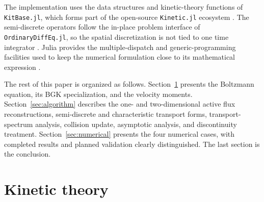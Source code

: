 \documentclass[preprint,3p,12pt]{elsarticle}
\begin{document}
The implementation uses the data structures and kinetic-theory functions of \texttt{KitBase.jl}, which forms part of the open-source \texttt{Kinetic.jl} ecosystem \cite{xiao2021kinetic}. The semi-discrete operators follow the in-place problem interface of \texttt{OrdinaryDiffEq.jl}, so the spatial discretization is not tied to one time integrator \cite{rackauckas2017differentialequations}. Julia provides the multiple-dispatch and generic-programming facilities used to keep the numerical formulation close to its mathematical expression \cite{bezanson2017julia}.

The rest of this paper is organized as follows. Section~\ref{sec:kinetic} presents the Boltzmann equation, its BGK specialization, and the velocity moments. Section~\ref{sec:algorithm} describes the one- and two-dimensional active flux reconstructions, semi-discrete and characteristic transport forms, transport-spectrum analysis, collision update, asymptotic analysis, and discontinuity treatment. Section~\ref{sec:numerical} presents the four numerical cases, with completed results and planned validation clearly distinguished. The last section is the conclusion.

\section{Kinetic theory}
\label{sec:kinetic}
\end{document}
